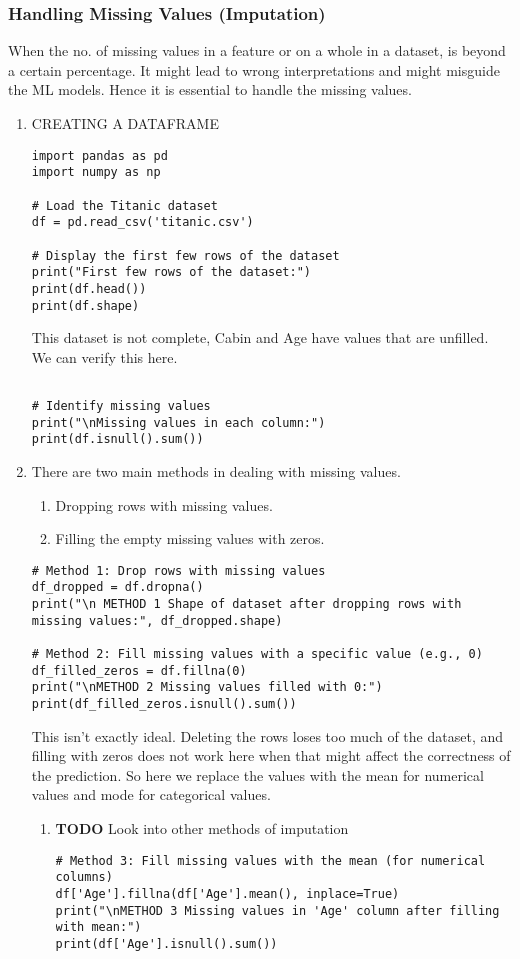 \documentclass[11pt]{article}
\begin{document}
\subsubsection{Handling Missing Values (Imputation)}
\label{sec:org88fe923}
When the no. of missing values in a feature or on a whole in a dataset, is beyond a certain percentage. It might lead to wrong interpretations and might misguide the ML models.
Hence it is essential to handle the missing values.
\begin{enumerate}
\item CREATING A DATAFRAME
\label{sec:org0e09d0c}
\begin{verbatim}
import pandas as pd
import numpy as np

# Load the Titanic dataset
df = pd.read_csv('titanic.csv')

# Display the first few rows of the dataset
print("First few rows of the dataset:")
print(df.head())
print(df.shape)
\end{verbatim}
This dataset is not complete, Cabin and Age have values that are unfilled. We can verify this here.
\begin{verbatim}

# Identify missing values
print("\nMissing values in each column:")
print(df.isnull().sum())

\end{verbatim}
\item There are two main methods in dealing with missing values.
\label{sec:org1074cae}
\begin{enumerate}
\item Dropping rows with missing values.
\item Filling the empty missing values with zeros.
\end{enumerate}
\begin{verbatim}
# Method 1: Drop rows with missing values
df_dropped = df.dropna()
print("\n METHOD 1 Shape of dataset after dropping rows with missing values:", df_dropped.shape)

# Method 2: Fill missing values with a specific value (e.g., 0)
df_filled_zeros = df.fillna(0)
print("\nMETHOD 2 Missing values filled with 0:")
print(df_filled_zeros.isnull().sum())

\end{verbatim}

This isn't exactly ideal. Deleting the rows loses too  much of the dataset, and filling with zeros does not work here when that might affect the correctness of the prediction.
So here we replace the values with the mean for numerical values and mode for categorical values.
\begin{enumerate}
\item {\bfseries\sffamily TODO} Look into other methods of imputation
\label{sec:orgf0fc74a}
\begin{verbatim}
# Method 3: Fill missing values with the mean (for numerical columns)
df['Age'].fillna(df['Age'].mean(), inplace=True)
print("\nMETHOD 3 Missing values in 'Age' column after filling with mean:")
print(df['Age'].isnull().sum())


\end{verbatim}
\end{enumerate}
\end{enumerate}
\end{document}

